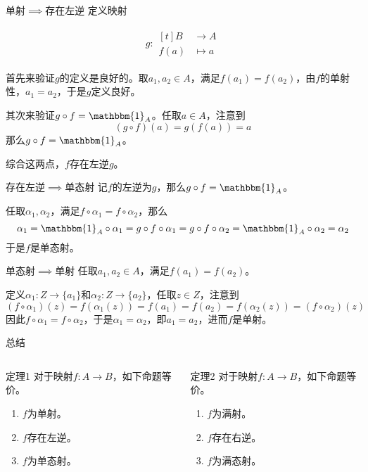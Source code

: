 \documentclass{beamer}
\newcommand{\function}[5]{
	\begin{align*}
		#1:\begin{aligned}[t]
			#2 &\longrightarrow #3\\
			#4 &\longmapsto #5
		\end{aligned}
	\end{align*}
}                                     %
\begin{document}
\begin{frame}{单射$\implies$存在左逆}
	定义映射
	\function{g}{B}{A}{f(a)}{a}
	
	首先来验证$g$的定义是良好的。取$a_1,a_2\in A$，满足$f(a_1)=f(a_2)$，由$f$的单射性，$a_1=a_2$，于是$g$定义良好。
	
	其次来验证$g\circ f=\mathbbm{1}_A$。任取$a\in A$，注意到
	$$
	(g\circ f)(a)=g(f(a))=a
	$$
	那么$g\circ f=\mathbbm{1}_A$。
	
	综合这两点，$f$存在左逆$g$。
\end{frame}

\begin{frame}{存在左逆$\implies$单态射}
	记$f$的左逆为$g$，那么$g\circ f=\mathbbm{1}_A$。
	
	任取$\alpha_1,\alpha_2$，满足$f\circ \alpha_1=f\circ \alpha_2$，那么
	$$
	\alpha_1=\mathbbm{1}_A\circ \alpha_1=g\circ f\circ \alpha_1=g\circ f\circ \alpha_2=\mathbbm{1}_A\circ \alpha_2=\alpha_2
	$$
	于是$f$是单态射。
\end{frame}

\begin{frame}{单态射$\implies$单射}
	任取$a_1,a_2\in A$，满足$f(a_1)=f(a_2)$。
	
	定义$\alpha_1:Z\to \{a_1\}$和$\alpha_2:Z\to \{a_2\}$，任取$z\in Z$，注意到
	$$
	(f\circ \alpha_1)(z)=f(\alpha_1(z))=f(a_1)=f(a_2)=f(\alpha_2(z))=(f\circ \alpha_2)(z)
	$$
	因此$f\circ\alpha_1=f\circ\alpha_2$，于是$\alpha_1=\alpha_2$，即$a_1=a_2$，进而$f$是单射。
\end{frame}

\begin{frame}{总结}
	\begin{columns}[T]
		
		
		
		\begin{block}{定理1}
			对于映射$f:A\to B$，如下命题等价。
			\begin{enumerate}
				\item $f$为单射。
				\item $f$存在左逆。
				\item $f$为单态射。
			\end{enumerate}
		\end{block}
		
		
		\begin{block}{定理2}
			对于映射$f:A\to B$，如下命题等价。
			\begin{enumerate}
				\item $f$为满射。
				\item $f$存在右逆。
				\item $f$为满态射。
			\end{enumerate}
		\end{block}
		
	\end{columns}

\end{frame}
\end{document}
